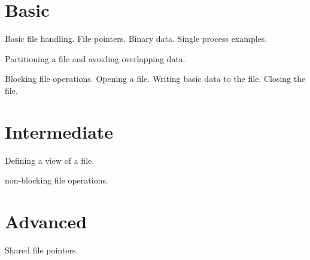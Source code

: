 \section{Basic}

Basic file handling. File pointers. Binary data. Single process examples.

Partitioning a file and avoiding overlapping data.

Blocking file operations. Opening a file. Writing basic data to the file. Closing the file.

\section{Intermediate}

Defining a view of a file. 

non-blocking file operations.

\section{Advanced}

Shared file pointers.

